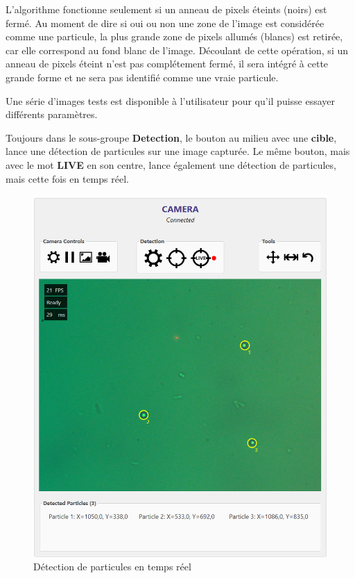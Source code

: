 L'algorithme fonctionne seulement si un anneau de pixels éteints (noirs) est fermé. Au moment de dire si oui ou non une zone de l'image est considérée comme une particule, la plus grande zone de pixels allumés (blancs) est retirée, car elle correspond au fond blanc de l'image. Découlant de cette opération, si un anneau de pixels éteint n'est pas complétement fermé, il sera intégré à cette grande forme et ne sera pas identifié comme une vraie particule.

Une série d'images tests est disponible à l'utilisateur pour qu'il puisse essayer différents paramètres.

Toujours dans le sous-groupe \textbf{Detection}, le bouton au milieu avec une \textbf{cible}, lance une détection de particules sur une image capturée. Le même bouton, mais avec le mot \textbf{LIVE} en son centre, lance également une détection de particules, mais cette fois en temps réel.
\newpage
\begin{figure}[H]
    \centering
    \includegraphics[width=\textwidth]{assets/figures/Application_ServoVision/Live_Targeting_Bead.png}
    \caption{Détection de particules en temps réel}
    \label{Live_Targeting_Bead}
\end{figure}

